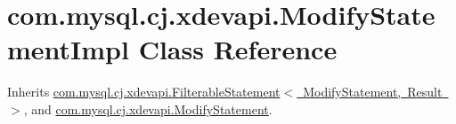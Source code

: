 \hypertarget{classcom_1_1mysql_1_1cj_1_1xdevapi_1_1_modify_statement_impl}{}\section{com.\+mysql.\+cj.\+xdevapi.\+Modify\+Statement\+Impl Class Reference}
\label{classcom_1_1mysql_1_1cj_1_1xdevapi_1_1_modify_statement_impl}


Inherits \mbox{\hyperlink{classcom_1_1mysql_1_1cj_1_1xdevapi_1_1_filterable_statement}{com.\+mysql.\+cj.\+xdevapi.\+Filterable\+Statement$<$ Modify\+Statement, Result $>$}}, and \mbox{\hyperlink{interfacecom_1_1mysql_1_1cj_1_1xdevapi_1_1_modify_statement}{com.\+mysql.\+cj.\+xdevapi.\+Modify\+Statement}}.

